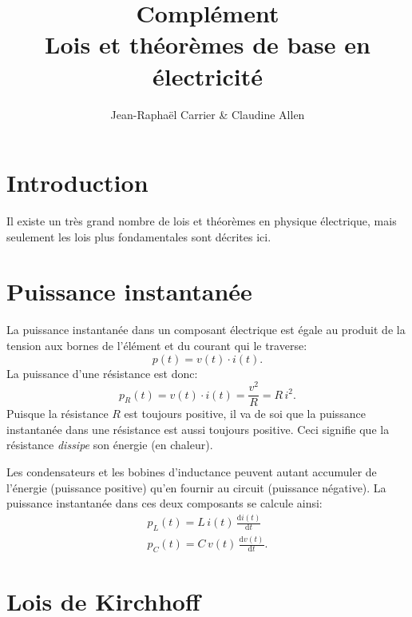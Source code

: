 \documentclass[12pt,oneside,letterpaper]{article}
\begin{document}
\title{\textbf{Complément}\\Lois et théorèmes de base en électricité}
\author{Jean-Raphaël Carrier \& Claudine Allen}
\date{}
\maketitle


\section{Introduction}

Il existe un très grand nombre de lois et théorèmes en physique électrique, mais seulement les lois plus fondamentales sont décrites ici.


\section{Puissance instantanée}

La puissance instantanée dans un composant électrique est égale au produit de la tension aux bornes de l'élément et du courant qui le traverse:
\begin{equation}
\label{eq-loi-joule}
p\!\left(t\right)=v\!\left(t\right)\cdot i\!\left(t\right).
\end{equation}
La puissance d'une résistance est donc:
\begin{equation}
\label{eq-puissance-R}
p_{R}\!\left(t\right)=v\!\left(t\right)\cdot i\!\left(t\right)=\frac{v^2}{R}=R \, i^2.
\end{equation}
Puisque la résistance $R$ est toujours positive, il va de soi que la puissance instantanée dans une résistance est aussi toujours positive. Ceci signifie que la résistance \textit{dissipe} son énergie (en chaleur).

Les condensateurs et les bobines d'inductance peuvent autant accumuler de l'énergie (puissance positive) qu'en fournir au circuit (puissance négative). La puissance instantanée dans ces deux composants se calcule ainsi:
\begin{gather}
\label{eq-puissance-L}
p_{L}\!\left(t\right)=L \, i\!\left(t\right) \, \frac{\mathrm{d}i\!\left(t\right)}{\mathrm{d}t}\\
\label{eq-puissance-C}
p_{C}\!\left(t\right)=C \, v\!\left(t\right) \, \frac{\mathrm{d}v\!\left(t\right)}{\mathrm{d}t}.
\end{gather}


\section{Lois de Kirchhoff}
\end{document}
